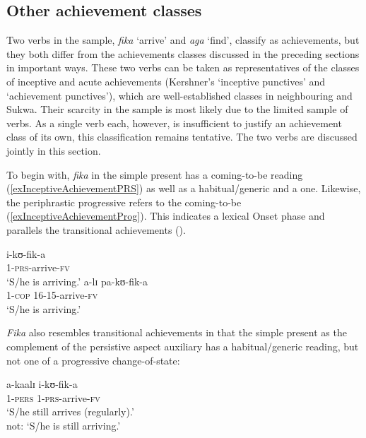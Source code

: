 \subsection{Other achievement classes}\label{VerbalClassOtherAchievements}
Two verbs in the sample, \textit{fika} \lq arrive' and \textit{aga} \lq find', classify as achievements, but they both differ from the achievements classes discussed in the preceding sections in important ways. These two verbs can be taken as representatives of the classes of inceptive and acute achievements (Kershner's \lq inceptive punctives' and \lq achievement punctives'), which are well-established classes in neighbouring  and Sukwa. Their scarcity in the sample is most likely due to the limited sample of verbs. As a single verb each, however, is insufficient to justify an achievement class of its own, this classification remains tentative. The two verbs are discussed jointly in this section.

To begin with, \textit{fika} in the simple present has a coming-to-be reading (\ref{exInceptiveAchievementPRS}) as well as a habitual/generic and a  one. Likewise, the periphrastic progressive refers to the coming-to-be (\ref{exInceptiveAchievementProg}). This indicates a lexical Onset phase and parallels the transitional achievements ().

\begin{exe}
\begin{multicols}{2}
\ex \label{exInceptiveAchievementPRS}

\gll i-kʊ-fik-a\\
1-\textsc{prs}-arrive-\textsc{fv}\\
\glt \lq S/he is arriving.'
\columnbreak
\ex \label{exInceptiveAchievementProg}
\gll a-lɪ pa-kʊ-fik-a\\
1-\textsc{cop} 16-15-arrive-\textsc{fv}\\
\glt \lq S/he is arriving.'
\end{multicols}
\end{exe}

\textit{Fika} also resembles transitional achievements in that the simple present as the complement of the persistive aspect auxiliary has a habitual/generic reading, but not one of a progressive change-of-state:

\begin{exe}
\ex \gll a-kaalɪ i-kʊ-fik-a\\
1-\textsc{pers} 1-\textsc{prs}-arrive-\textsc{fv}\\
\glt \lq S/he still arrives (regularly).'\\
not: \lq S/he is still arriving.'
\end{exe}

